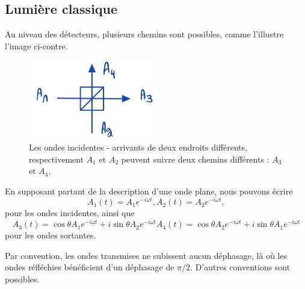 \documentclass[../notesdecours.tex]{subfiles}
\begin{document}
\subsection{Lumière classique}
Au niveau des détecteurs, plusieurs chemins sont possibles, comme l'illustre l'image ci-contre.
\begin{center}
\begin{figure}[h]
\centering
\includegraphics[width=0.50\textwidth]{bean.png}
\caption{Les ondes incidentes - arrivants de deux endroits différents, respectivement $A_1$ et $A_2$ peuvent suivre deux chemins différents : $A_3$ et $A_4$.}
\label{Interferometre}
\end{figure}
\end{center}
En supposant partant de la description d'une onde plane, nous pouvons écrire
\begin{subequations}
\begin{equation}
A_1 (t) = A_1e^{-i\omega t},
\end{equation}
\begin{equation}
A_2 (t) = A_2e^{-i\omega t},
\end{equation}
\end{subequations}
pour les ondes incidentes, ainsi que
\begin{subequations}
\begin{equation}
A_3 (t) = \cos\theta A_1e^{-i\omega t} + i \sin\theta A_2e^{-i\omega t}
\end{equation}
\begin{equation}
A_4 (t) = \cos\theta A_2e^{-i\omega t} + i\sin\theta  A_1e^{-i\omega t}
\end{equation}
\end{subequations}
pour les ondes sortantes.
\begin{remark} Par convention, les ondes transmises ne subissent aucun déphasage, là où les ondes réfléchies bénéficient d'un déphasage de $\pi / 2$. D'autres conventions sont possibles.\end{remark}
\end{document}
